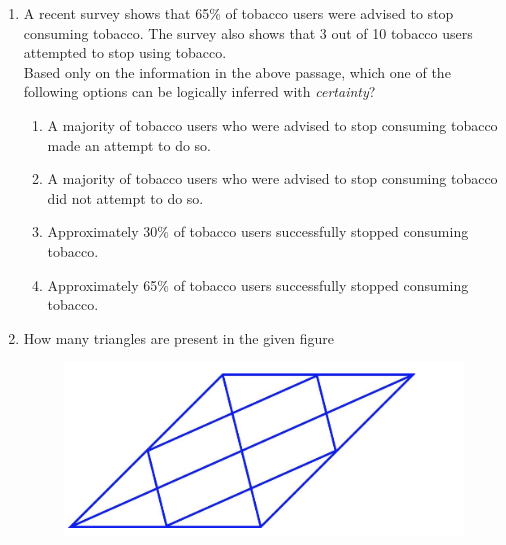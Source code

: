 \documentclass[12pt]{article}
\theoremstyle{remark}
\begin{document}
\begin{enumerate}
\begin{enumerate}
 \end{enumerate}
\hfill{}
\item A recent survey shows that 65\% of tobacco users were advised to stop consuming tobacco. The survey also shows that 3 out of 10 tobacco users attempted to stop using tobacco.\\
Based only on the information in the above passage, which one of the following options can be logically inferred with \textit{certainty}?
\begin{enumerate}
\item A majority of tobacco users who were advised to stop consuming tobacco made an attempt to do so.
\item A majority of tobacco users who were advised to stop consuming tobacco did not attempt to do so. 
\item Approximately 30\% of tobacco users successfully stopped consuming tobacco. 
\item Approximately 65\% of tobacco users successfully stopped consuming tobacco.
\end{enumerate}
\hfill{}
\newline
\item How many triangles are present in the given figure
\begin{centering}
\begin{figure}[H] 
\includegraphics{Figs/Q5.png}
\caption{}
\label{Fig:1.1} 
\end{figure}
\end{centering}
\begin{enumerate} 
\end{enumerate}
\end{enumerate}
\end{document}
